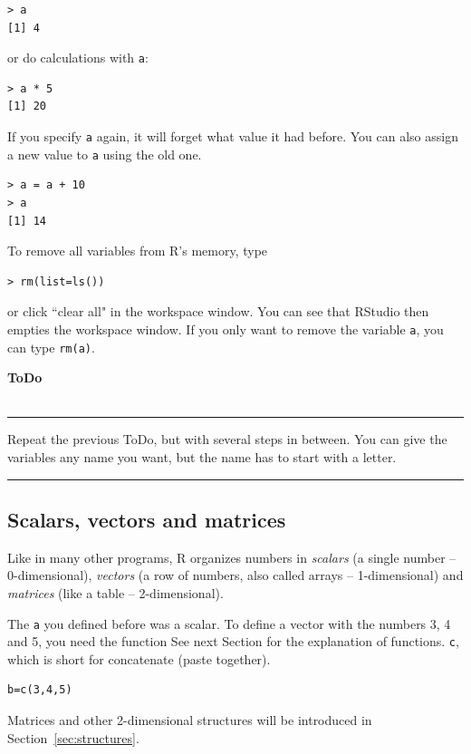 \documentclass[a4paper,11pt,twocolumn,tablecaptionabove]{scrartcl} %
\makeatletter
\newenvironment{ToDo} {%
  \begin{flushright}
    \hfill
    \begin{minipage}{0.95\columnwidth}         %
    \textsf{\textbf{ToDo}} \\
      \vspace{-0.85cm}\\
      {\color{Gray}\rule[-0.1cm]{\columnwidth}{1.5pt}}} { %
      {\color{Gray} \rule[0.3cm]{\columnwidth}{1.5pt}}
    \end{minipage}
    \vspace{1em}
  \end{flushright}
  }
\let\SF@@footnote\footnote
\def\footnote{\ifx\protect\@typeset@protect
 \expandafter\SF@@footnote
 \else
 \expandafter\SF@gobble@opt
 \fi
}
\edef\SF@gobble@opt{\noexpand\protect
 \expandafter\noexpand\csname SF@gobble@opt \endcsname}
\makeatother
\begin{document}
\begin{Verbatim}[frame=single,gobble=0]
> a 
[1] 4
\end{Verbatim}
or do calculations with \texttt{a}: 

\begin{Verbatim}[frame=single,gobble=0]
> a * 5
[1] 20
\end{Verbatim}

If you specify \texttt{a} again, it will forget what value it had before. You can also assign a new value to \texttt{a} using the old one.

\begin{Verbatim}[frame=single,gobble=0]
> a = a + 10
> a
[1] 14
\end{Verbatim}

To remove all variables from R's memory, type
\begin{Verbatim}[frame=single,gobble=0]
> rm(list=ls())
\end{Verbatim}
or click ``clear all" in the workspace window. You can see that RStudio then empties the workspace window. If you only want to remove the variable \texttt{a}, you can type \texttt{rm(a)}.

\begin{ToDo}
Repeat the previous ToDo, but with several steps in between. You can give the variables any name you want, but the name has to start with a letter. \\
\end{ToDo}

\subsection{Scalars, vectors and matrices}

Like in many other programs, R organizes numbers in \emph{scalars} (a single number -- 0-dimensional), \emph{vectors} (a row of numbers, also called arrays -- 1-dimensional) and \emph{matrices} (like a table -- 2-dimensional).

The \texttt{a} you defined before was a scalar. To define a vector with the numbers 3, 4 and 5, you need the function\footnote{See next Section for the explanation of functions.} \texttt{c}, which is short for concatenate (paste together). 
\begin{Verbatim}[frame=single,gobble=0]
b=c(3,4,5)
\end{Verbatim}

Matrices and other 2-dimensional structures will be introduced in Section~\ref{sec:structures}.
\end{document}
